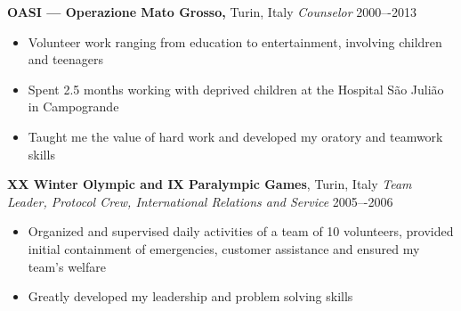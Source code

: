 
\vspace{7pt}

\textbf{OASI --- Operazione Mato Grosso,} Turin, Italy \newline
\emph{Counselor} \hfill{2000–-2013}
\begin{itemize}
  \item Volunteer work ranging from education to entertainment, involving children and teenagers
  \item Spent 2.5 months working with deprived children at the Hospital São Julião in Campogrande
  \item Taught me the value of hard work and developed my oratory and teamwork skills
\end{itemize}

\medskip
\textbf{XX Winter Olympic and IX Paralympic Games}, Turin, Italy\newline
\emph{Team Leader, Protocol Crew, International Relations and Service} \hfill{2005–-2006}
\begin{itemize}
  \item Organized and supervised daily activities of a team of 10 volunteers, provided initial containment of emergencies, customer assistance and ensured my team’s welfare
  \item Greatly developed my leadership and problem solving skills
\end{itemize}
